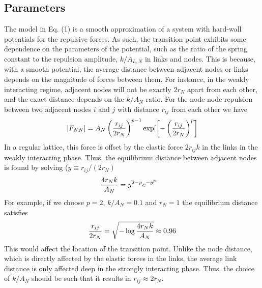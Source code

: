 \documentclass[12pt]{article}%
\newcommand{\outNim}[1]{}
\begin{document}
\subsection{Parameters}
The model in Eq. (1) is a smooth approximation of a system with hard-wall potentials for the repulsive forces. 
As such, the transition point exhibits some dependence on the parameters of the potential, such as the ratio of the spring constant to the repulsion amplitude, $k/A_{L,N}$ in links and nodes. 
This is because, with a smooth potential, the average distance between adjacent nodes or links depends on the magnitude of forces between them. 
For instance, in the weakly interacting regime, adjacent nodes will not be exactly $2r_N$ apart from each other, and the exact distance depends on the $k/A_N$ ratio. 
For the node-node repulsion between two adjacent nodes $i$ and $j$ with distance $r_{ij}$ from each other we have 
\begin{align}
    |F_{NN}| = A_N\left({r_{ij}\over 2r_N}\right)^{p-1} \exp[\left[-\left({r_{ij}\over 2r_N}\right)^{p} \right]
\end{align}
In a regular lattice, this force is offset by the elastic force $2r_{ij} k$ in the links in the weakly interacting phase.
Thus, the equilibrium distance between adjacent nodes is found by solving ($y\equiv r_{ij}/(2r_N)$
\begin{align}
{4r_N k \over A_N} &= y^{2-p} e^{-y^p}    
\end{align}
For example, if we choose $p=2$, $k/A_N = 0.1 $ and $r_N=1$ the equilibrium distance satisfies 
\[{r_{ij}\over 2 r_N} = \sqrt{- \log {4r_N k\over A_N}} \approx 0.96\]
This would affect the location of the transition point.
Unlike the node distance, which is directly affected by the elastic forces in the links, the average link distance is only affected deep in the strongly interacting phase. 
Thus, the choice of $k/A_N$ should be such that it results in $r_{ij} \approx 2r_N$. 

\outNim{
However, we have the same kind of potential for link repulsion and as long as the choice of $k/A_{L,N}$ and $p$ are the same for links and nodes, we expect the ratio of $r_{ij}/(2r_N)$ for adjacent nodes to be similar to $r_{lm}/(2r_L)$ for adjacent links, allowing us to ignore the effect of  
The transition point has some  dependence on the choice of parameters. 
$k/A_L$ ratio, as well as $A_L/A_N$. 
I am still unable to reproduce exactly the transitions I had observed in the 040518 data, which seems to be a copy of the 032818 and 032918 data. 
Now I am able to, but the dependence on $k/A$ is still enigmatic. 
} 
\end{document}
